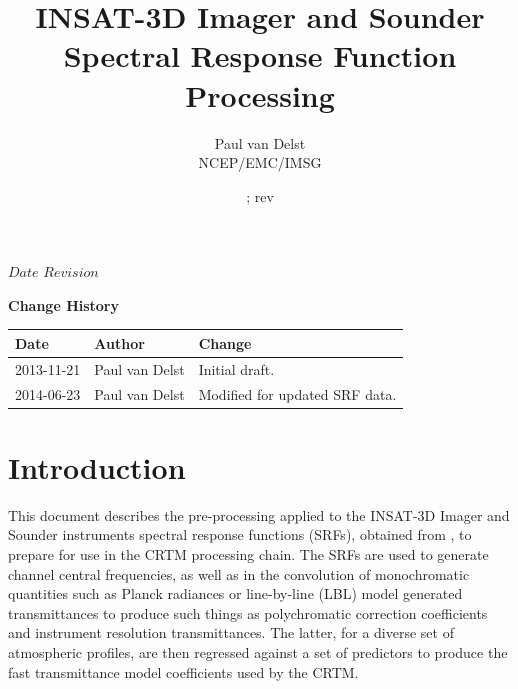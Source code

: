 



\SVN $Date$
\SVN $Revision$

\title{INSAT-3D Imager and Sounder Spectral Response Function Processing}
\author{Paul van Delst\\NCEP/EMC/IMSG}
\date{\SVNDate ; rev\SVNRevision}



\maketitle

\draftwatermark

\thispagestyle{empty}
\vspace*{10cm}
\begin{center}
  {\sffamily\Large\bfseries Change History}
  \begin{table}[htp]
    \centering
    \begin{tabular}{|p{2cm}|p{3cm}|p{8cm}|}
      \hline
      \sffamily\textbf{Date} & \sffamily\textbf{Author} & \sffamily\textbf{Change}\\
      \hline\hline
      2013-11-21 & Paul van Delst & Initial draft.\\
      \hline
      2014-06-23 & Paul van Delst & Modified for updated SRF data.\\
      \hline
    \end{tabular}
  \end{table}
\end{center}
\clearpage
\pagestyle{fancy}
\fancyhead[LE,RO]{\sffamily \rightmark}
\fancyhead[LO,RE]{\sffamily \leftmark}
\setcounter{page}{1}



\section{Introduction}
This document describes the pre-processing applied to the INSAT-3D Imager and Sounder instruments spectral response functions (SRFs), obtained from \cite{INSAT3D_SRF_Data2}, to prepare for use in the CRTM processing chain. The SRFs are used to generate channel central frequencies, as well as in the convolution of monochromatic quantities such as Planck radiances or line-by-line (LBL) model generated transmittances to produce such things as polychromatic correction coefficients and instrument resolution transmittances. The latter, for a diverse set of atmospheric profiles, are then regressed against a set of predictors to produce the fast transmittance model coefficients used by the CRTM.

